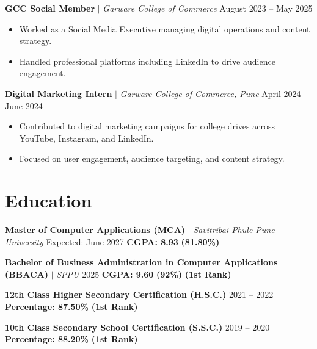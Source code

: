 \documentclass[a4paper,10pt]{article}
\begin{document}
\vspace{6pt}

\textbf{GCC Social Member} $|$ \textit{Garware College of Commerce} \hfill August 2023 -- May 2025\\
\vspace{-6pt}
\begin{itemize}[leftmargin=*]
    \item Worked as a Social Media Executive managing digital operations and content strategy.
    \item Handled professional platforms including LinkedIn to drive audience engagement.
\end{itemize}

\vspace{6pt}

\textbf{Digital Marketing Intern} $|$ \textit{Garware College of Commerce, Pune} \hfill April 2024 -- June 2024\\
\vspace{-6pt}
\begin{itemize}[leftmargin=*]
    \item Contributed to digital marketing campaigns for college drives across YouTube, Instagram, and LinkedIn.
    \item Focused on user engagement, audience targeting, and content strategy.
\end{itemize}

\section*{Education}
\textbf{Master of Computer Applications (MCA)} $|$ \textit{Savitribai Phule Pune University} \hfill Expected: June 2027 \quad \textbf{CGPA: 8.93} \textbf{(81.80\%)}

\vspace{4pt} 

\textbf{Bachelor of Business Administration in Computer Applications (BBACA)} $|$ \textit{SPPU} \hfill 2025 \quad \textbf{CGPA: 9.60} \textbf{(92\%)} \quad \textbf{(1st Rank)}

\vspace{4pt} 

\textbf{12th Class Higher Secondary Certification (H.S.C.)} \hfill 2021 -- 2022 \quad \textbf{Percentage: 87.50\%} \quad \textbf{(1st Rank)}

\vspace{4pt} 

\textbf{10th Class Secondary School Certification (S.S.C.)} \hfill 2019 -- 2020 \quad \textbf{Percentage: 88.20\%} \quad \textbf{(1st Rank)}
\end{document}
